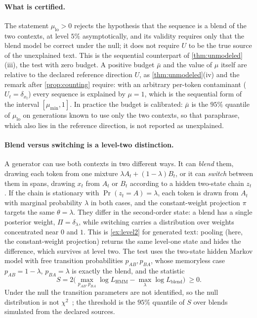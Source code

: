 \paragraph{What is certified.} The statement $\mu_{\mathrm{lo}}>0$ rejects the hypothesis that the
sequence is a blend of the two contexts, at level $5\%$ asymptotically, and its validity requires
only that the blend model be correct under the null; it does not require $U$ to be the true source
of the unexplained text. This is the sequential counterpart of \cref{thm:unmodeled}(iii), the test
with zero budget. A positive budget $\bar\mu$ and the value of $\mu$ itself are relative to the
declared reference direction $U$, as \cref{thm:unmodeled}(iv) and the remark after
\cref{prop:counting} require: with an arbitrary per-token contaminant ($U_t=\delta_{x_t}$) every
sequence is explained by $\mu=1$, which is the sequential form of the interval $[\mu_{\min},1]$.
In practice the budget is calibrated: $\bar\mu$ is the $95\%$ quantile of $\mu_{\mathrm{lo}}$ on
generations known to use only the two contexts, so that paraphrase, which also lies in the
reference direction, is not reported as unexplained.

\paragraph{Blend versus switching is a level-two distinction.} A generator can use both contexts in
two different ways. It can \emph{blend} them, drawing each token from one mixture
$\lambda A_t+(1-\lambda)B_t$, or it can \emph{switch} between them in spans, drawing $x_t$ from $A_t$
or $B_t$ according to a hidden two-state chain $z_t$. If the chain is stationary with
$\Pr(z_t=A)=\lambda$, each token is drawn from $A_t$ with marginal probability $\lambda$ in both
cases, and the constant-weight projection $\pi$ targets the same $\theta=\lambda$. They differ in the second-order state: a blend has a single posterior
weight, $\Pi=\delta_\lambda$, while switching carries a distribution over weights concentrated near
$0$ and $1$. This is \cref{ex:level2} for generated text: pooling (here, the constant-weight
projection) returns the same level-one state and hides the difference, which survives at level two.
The test uses the two-state hidden Markov model with free transition probabilities $p_{AB},p_{BA}$,
whose memoryless case $p_{AB}=1-\lambda$, $p_{BA}=\lambda$ is exactly the blend, and the statistic
\[
S=2\Big(\max_{p_{AB},p_{BA}}\log L_{\mathrm{HMM}}-\max_\lambda\log L_{\mathrm{blend}}\Big)\ \ge0.
\]
Under the null the transition parameters are not identified, so the null distribution is not
$\chi^2$~\cite{Davies1977}; the threshold is the $95\%$ quantile of $S$ over blends simulated from
the declared sources.

